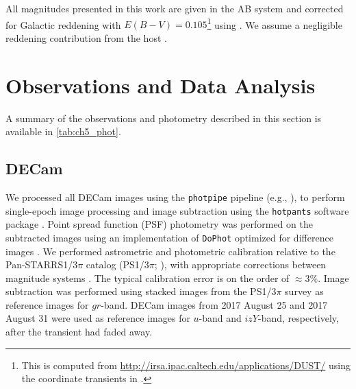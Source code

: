 \clearpage
All magnitudes presented in this work are given in the AB system and corrected for Galactic reddening with $E(B-V)=0.105$\footnote{This is computed from \url{http://irsa.ipac.caltech.edu/applications/DUST/} using the coordinate transients in \cite{GW170817DECam}.} using \cite{SchlaflyFinkbeiner11}. We assume a negligible reddening contribution from the host \citep{Blanchard+17}.

\section{Observations and Data Analysis}
\label{sec:ch5_observations}

A summary of the observations and photometry described in this section is available in \cref{tab:ch5_phot}.

\subsection{DECam}
\label{sec:ch5_data}
We processed all DECam images using the {\tt photpipe} pipeline (e.g., \citealt{Rest+05,Rest+14}), to perform single-epoch image processing and image subtraction using the {\tt hotpants} software package \citep{Becker2015}. Point spread function (PSF) photometry was performed on the subtracted images using an implementation of {\tt DoPhot} optimized for difference images \citep{Schechter+93}. We performed astrometric and photometric calibration relative to the Pan-STARRS1/$3\pi$ catalog (PS1/$3\pi$; \citealt{Chambers+16}), with appropriate corrections between magnitude systems \citep{Scolnic+15}. The typical calibration error is on the order of $\approx3\%$. Image subtraction was performed using stacked images from the PS1/$3\pi$ survey as reference images for $gr$-band. DECam images from 2017 August 25 and 2017 August 31 were used as reference images for $u$-band and $izY$-band, respectively, after the transient had faded away.


